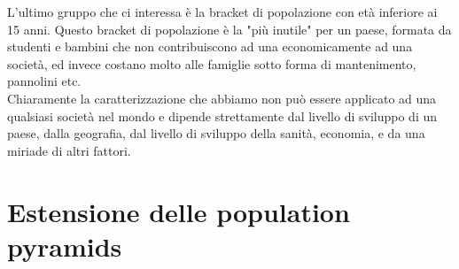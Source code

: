 \documentclass[11pt, oneside]{article}
\begin{document}
L'ultimo gruppo che ci interessa è la bracket di popolazione con età inferiore ai 15 anni. Questo bracket di popolazione è la "più inutile" per un paese, formata da studenti e bambini che non contribuiscono ad una economicamente ad una società, ed invece costano molto alle famiglie sotto forma di mantenimento, pannolini etc.\\

Chiaramente la caratterizzazione che abbiamo non può essere applicato ad una qualsiasi società nel mondo e dipende strettamente dal livello di sviluppo di un paese, dalla geografia, dal livello di sviluppo della sanità, economia, e da una miriade di altri fattori. 

\section{Estensione delle population pyramids}
\end{document}
